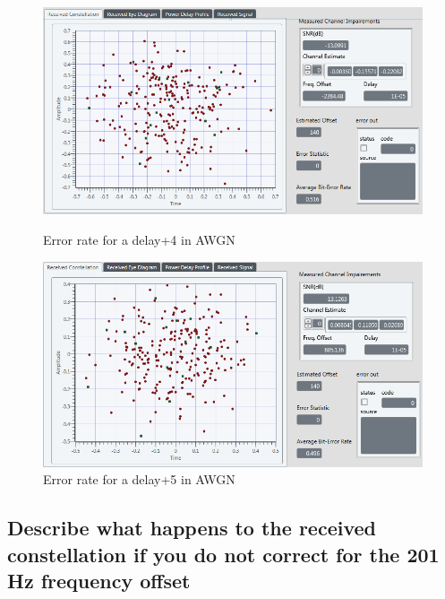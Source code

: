 \documentclass[frenchb, oneside, headings=normal]{scrartcl}
\begin{document}
\begin{figure}[!ht]
    \begin{minipage}[b]{0.48\linewidth}
        \centering \includegraphics[scale=0.45]{img/Sliding_correletaion_OFF_AWGN_5dB_shift_bit_4.PNG}
     \caption{Error rate for a delay+4 in AWGN}
     \label{fig5}
    \end{minipage}\hfill
    \begin{minipage}[b]{0.48\linewidth}
         \centering \includegraphics[scale=0.45]{img/Sliding_correletaion_OFF_AWGN_5dB_shift_bit_5.PNG}
 \caption{Error rate for a delay+5 in AWGN}\label{fig6}
    \end{minipage}
\end{figure}


\subsection{Describe what happens to the received constellation if you do not correct for the 201 Hz frequency offset}
\end{document}
